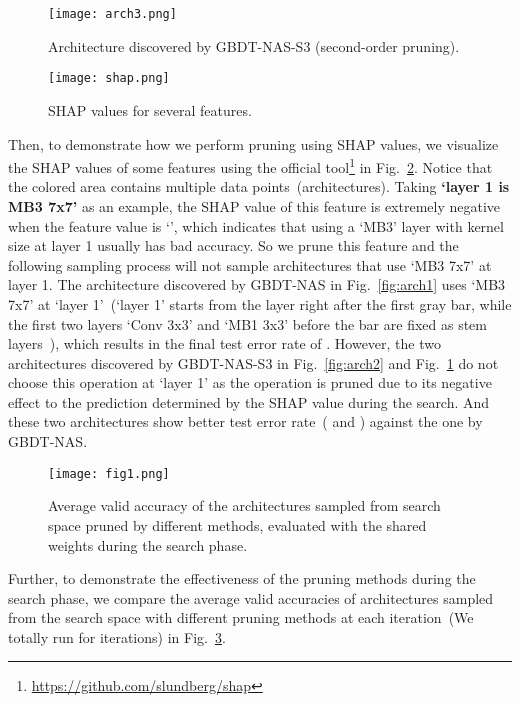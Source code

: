 \documentclass{article}
\begin{document}
\begin{figure}[htbp]
\centering
\texttt{[image: arch3.png]}
\caption{Architecture discovered by GBDT-NAS-S3 (second-order pruning).}
\label{fig:arch3}
\end{figure}

\begin{figure}[htbp]
\centering
\texttt{[image: shap.png]}
\caption{SHAP values for several features.}
\label{fig:shap}
\end{figure}

Then, to demonstrate how we perform pruning using SHAP values, we visualize the SHAP values of some features using the official tool\footnote{\url{https://github.com/slundberg/shap}} in Fig.~\ref{fig:shap}. Notice that the colored area contains multiple data points~(architectures). Taking \textbf{`layer 1 is MB3 7x7'} as an example, the SHAP value of this feature is extremely negative when the feature value is `', which indicates that using a `MB3' layer with kernel size  at layer 1 usually has bad accuracy. So we prune this feature and the following sampling process will not sample architectures that use `MB3 7x7' at layer 1. The architecture discovered by GBDT-NAS in Fig.~\ref{fig:arch1} uses `MB3 7x7' at `layer 1'~(`layer 1' starts from the layer right after the first gray bar, while the first two layers `Conv 3x3' and `MB1 3x3' before the bar are fixed as stem layers~\cite{proxylessnas}), which results in the final test error rate of . However, the two architectures discovered by GBDT-NAS-S3 in Fig.~\ref{fig:arch2} and Fig.~\ref{fig:arch3} do not choose this operation at `layer 1' as the operation is pruned due to its negative effect to the prediction determined by the SHAP value during the search. And these two architectures show better test error rate~( and ) against the one by GBDT-NAS.

\begin{figure}[htbp]
\centering
\texttt{[image: fig1.png]}
\caption{Average valid accuracy of the architectures sampled from search space pruned by different methods, evaluated with the shared weights during the search phase.}
\label{fig:acc}
\end{figure}

Further, to demonstrate the effectiveness of the pruning methods during the search phase, we compare the average valid accuracies of architectures sampled from the search space with different pruning methods at each iteration~(We totally run for  iterations) in Fig.~\ref{fig:acc}. 
\end{document}
